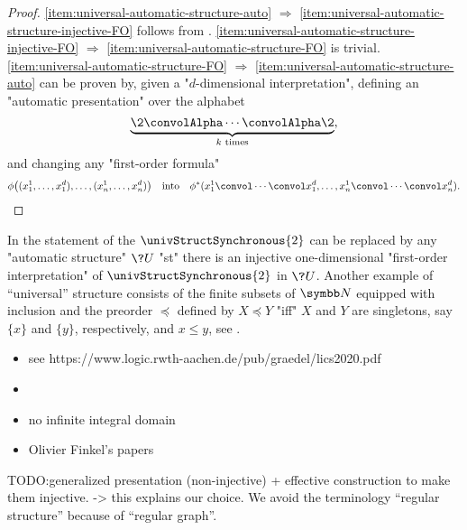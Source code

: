 \begin{proof}
	\eqref{item:universal-automatic-structure-auto} $\Rightarrow$
	\eqref{item:universal-automatic-structure-injective-FO} follows from
	.
	\eqref{item:universal-automatic-structure-injective-FO} $\Rightarrow$
	\eqref{item:universal-automatic-structure-FO} is trivial.
	\eqref{item:universal-automatic-structure-FO} $\Rightarrow$
	\eqref{item:universal-automatic-structure-auto} can be proven by,
	given a "$d$-dimensional interpretation", defining an "automatic presentation"
	over the alphabet
	\[
		\underbrace{\2 \convolAlpha \cdots \convolAlpha \2}_{
			\text{$k$ times}
		},
	\]
	and changing any "first-order formula"
	\[
		\phi\big((x_1^1, \hdots, x_1^d), \hdots, (x_n^1, \hdots, x_n^d)\big)
		\quad\text{into}\quad
		\phi^*(x_1^1 \convol \cdots \convol x_1^d, \hdots, x_n^1 \convol \cdots \convol x_n^d).\qedhere
	\]
\end{proof}

In the statement of \label{prop:universal-automatic-structure} the
$\univStructSynchronous{2}$ can be replaced by any "automatic structure" $\?U$
"st" there is an injective one-dimensional "first-order interpretation" of
$\univStructSynchronous{2}$ in $\?U$. 
Another example of ``universal'' structure consists of the finite subsets of $\N$ equipped
with inclusion and the preorder $\preceq$ defined by $X \preceq Y$ "iff" $X$ and $Y$ are 
singletons, say $\{x\}$ and $\{y\}$, respectively, and $x \leq y$,
see \cite[Theorem~XII.2.3]{Blumensath2024MSOModelTheory}.


\begin{itemize}
	\itemAP ""automatic graph""
	\item see https://www.logic.rwth-aachen.de/pub/graedel/lics2020.pdf
	\item \cite[\S~6]{KhoussainovNerode1995AutomaticPresentations}
	\item no infinite integral domain \cite{KhoussainovNiesRubinStephan2007Automatic}
	\item Olivier Finkel's papers
\end{itemize}

TODO:generalized presentation (non-injective) + effective construction to make them injective.
-> this explains our choice. We avoid the terminology ``regular structure'' because of
``regular graph''.
